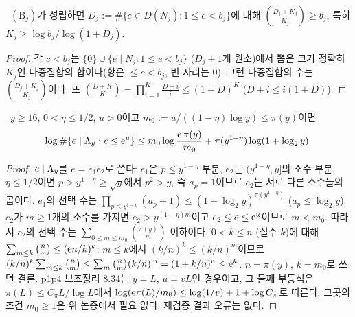 \begin{proposition}\label{STRUCT:prop-block-count}
\PROVED\ $(\mathrm B_j)$가 성립하면 $D_j:=\#\{e\in D(N_j):1\le e<b_j\}$에 대해 $\binom{D_j+K_j}{K_j}\ge b_j$, 특히 $K_j\ge\log b_j/\log(1+D_j)$.
\end{proposition}
\begin{proof}
각 $c<b_j$는 $\{0\}\cup\{e\mid N_j:1\le e<b_j\}$ ($D_j+1$개 원소)에서 뽑은 크기 정확히 $K_j$인 다중집합의 합이다(항은 $\le c<b_j$, 빈 자리는 $0$). 그런 다중집합의 수는 $\binom{D_j+K_j}{K_j}$이다. 또 $\binom{D+K}{K}=\prod_{i=1}^K\frac{D+i}{i}\le(1+D)^K$ ($D+i\le i(1+D)$).
\end{proof}

\begin{lemma}\label{STRUCT:lem-divcount}
\PROVED\ $y\ge16$, $0<\eta\le1/2$, $u>0$이고 $m_0:=u/((1-\eta)\log y)\le\pi(y)$이면
\[
\log\#\{e\mid\Lambda_y: e\le \mathrm{e}^u\}\le m_0\log\frac{\mathrm{e}\,\pi(y)}{m_0}+\pi(y^{1-\eta})\log(1+\log_2y).
\]
\end{lemma}
\begin{proof}
$e\mid\Lambda_y$를 $e=e_1e_2$로 쓴다: $e_1$은 $p\le y^{1-\eta}$ 부분, $e_2$는 $(y^{1-\eta},y]$의 소수 부분. $\eta\le1/2$이면 $p>y^{1-\eta}\ge\sqrt y$에서 $p^2>y$, 즉 $a_p=1$이므로 $e_2$는 서로 다른 소수들의 곱이다.
$e_1$의 선택 수는 $\prod_{p\le y^{1-\eta}}(a_p+1)\le(1+\log_2y)^{\pi(y^{1-\eta})}$ ($a_p\le\log_2y$).
$e_2$가 $m\ge1$개의 소수를 가지면 $e_2>y^{(1-\eta)m}$이고 $e_2\le e\le\mathrm{e}^u$이므로 $m<m_0$. 따라서 $e_2$의 선택 수는 $\sum_{0\le m\le m_0}\binom{\pi(y)}{m}$ 이하이다.
$0<k\le n$ (실수 $k$)에 대해 $\sum_{m\le k}\binom nm\le(\mathrm{e} n/k)^k$: $m\le k$에서 $(k/n)^k\le(k/n)^m$이므로 $(k/n)^k\sum_{m\le k}\binom nm\le\sum_m\binom nm(k/n)^m=(1+k/n)^n\le\mathrm{e}^k$. $n=\pi(y)$, $k=m_0$로 쓰면 결론.
p1p4 보조정리 8.34는 $y=L$, $u=vL$인 경우이고, 그 둘째 부등식은 $\pi(L)\le C_\pi L/\log L$에서 $\log(\mathrm{e}\pi(L)/m_0)\le\log(1/v)+1+\log C_\pi$로 따른다; 그곳의 조건 $m_0\ge1$은 위 논증에서 필요 없다. 재검증 결과 오류는 없다.
\end{proof}

